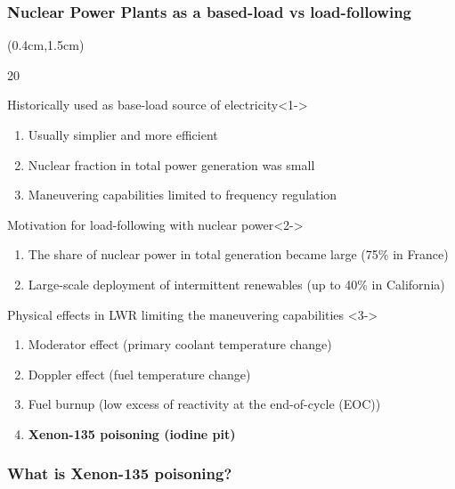 \begin{frame}
\frametitle{Nuclear Power Plants as a based-load vs load-following}
\begin{textblock*}{12cm}(0.4cm,1.5cm) %
\begin{overlayarea}{\linewidth}{20\baselineskip}
	\begin{block}{Historically used as base-load source of electricity}<1->
		\begin{enumerate}
			\item Usually simplier and more efficient
			\item Nuclear fraction in total power generation was small
			\item Maneuvering capabilities limited to frequency regulation
		\end{enumerate}
	\end{block}
	\begin{block}{Motivation for load-following with nuclear power}<2->
	\begin{enumerate}
		\item The share of nuclear power in total generation became large 
		(75\% in France)
		\item Large-scale deployment of intermittent renewables (up to 40\% in 
		California)
	\end{enumerate}
	\end{block}
	\begin{block}{Physical effects in \gls{LWR} limiting the maneuvering 
	capabilities 
		\cite{lokhov_technical_2011}}<3->
	\begin{enumerate}
		\item<3-> Moderator effect (primary coolant temperature change)
		\item<3-> Doppler effect (fuel temperature change)
		\item<4-> Fuel burnup (low excess of reactivity at the end-of-cycle 
		(EOC))
		\item<5-> \textbf{Xenon-135 poisoning (iodine pit)}
	\end{enumerate}
\end{block}
\end{overlayarea}
\end{textblock*}
\end{frame}

\begin{frame}
\frametitle{What is Xenon-135 poisoning?}
\end{frame}

